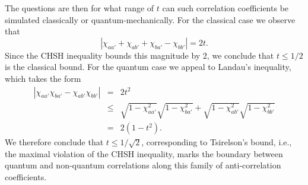 The questions are then for what range of $t$ can such correlation coefficients be simulated classically or quantum-mechanically. For the classical case we observe that 
\begin{equation}
|\chi_{aa'}+\chi_{ab'}+\chi_{ba'}-\chi_{bb'}| =2t.
\end{equation}
Since the CHSH inequality bounds this magnitude by $2$, we conclude that $t\leq 1/2$ is the classical bound. For the quantum case we appeal to Landau's inequality, which takes the form
\begin{eqnarray}
|\chi_{aa'}\chi_{ba'}-\chi_{ab'}\chi_{bb'}| & \!\! = \!\! & 2t^2 \nonumber \\[.1cm]
& \!\!  \leq \!\! & \sqrt{1-\chi_{aa'}^2}\sqrt{1-\chi_{ba'}^2}+\sqrt{1-\chi_{ab'}^2}\sqrt{1-\chi_{bb'}^2}  \\[.2cm]
&  \!\! = \!\!  & 2(1-t^2). \nonumber
\end{eqnarray}
We therefore conclude that $t\leq 1/\sqrt{2}$, corresponding to Tsirelson's bound, i.e., the maximal violation of the CHSH inequality, marks the boundary between quantum and non-quantum correlations along this family of anti-correlation coefficients.%
